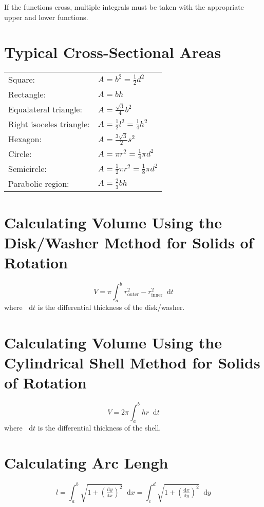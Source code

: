 \documentclass[12pt]{article}
\newcommand*{\fixmath}{\makebox{}\vspace{\glueexpr-\baselineskip-\abovedisplayskip}}
\newcommand*{\dd}[3][]{\tfrac{\mathrm{d}^{#1}#2}{\mathrm{d}#3^{#1}}}
\newcommand*{\D}[1]{\mathop{}\!\mathrm{d} #1}
\newenvironment{rmaskip}{\setlength{\abovedisplayskip}{0pt}\fixmath%
  \ignorespaces}{\ignorespacesafterend}
\newenvironment{rmbskip}{\setlength{\belowdisplayskip}{0pt}\ignorespaces}%
  {\ignorespacesafterend}
\begin{document}
If the functions cross, multiple integrals must be taken with the appropriate
upper and lower functions.
\section*{Typical Cross-Sectional Areas}
{\renewcommand{\arraystretch}{1.5}\begin{tabular}{l@{ }l}
  Square: & \(A = b^2 = \frac{1}{2}d^2\)\\
  Rectangle: & \(A = bh\)\\
  Equalateral triangle: & \(A = \frac{\sqrt{3}}{4}b^2\)\\
  Right isoceles triangle: & \(A = \frac{1}{2}l^2 = \frac{1}{4}h^2\)\\
  Hexagon: & \(A = \frac{3\sqrt{3}}{2} s^2\)\\
  Circle: & \(A = \pi r^2 = \frac{1}{4}\pi d^2\)\\
  Semicircle: & \(A = \frac{1}{2}\pi r^2 = \frac{1}{8}\pi d^2\)\\
  Parabolic region: & \(A = \frac{2}{3}bh\)
\end{tabular}}
\section*{Calculating Volume Using the Disk\slash Washer Method for Solids of
Rotation}
\begin{rmaskip}
  \[
    V = \pi\int_a^b r_{\text{outer}}^2 - r_{\text{inner}}^2 \D{t}
  \]
\end{rmaskip}
where \(\D{t}\) is the differential thickness of the disk\slash washer.
\section*{Calculating Volume Using the Cylindrical Shell Method for Solids of
Rotation}
\begin{rmaskip}
  \[
    V = 2\pi \int_a^b hr \D{t}
  \]
\end{rmaskip}
where \(\D{t}\) is the differential thickness of the shell.
\section*{Calculating Arc Lengh}
\begin{rmbskip}
  \[
    l = \int_a^b \sqrt{1+{\left(\dd{y}{x}\right)}^2} \D{x}
    = \int_c^d \sqrt{1+{\left(\dd{x}{y}\right)}^2} \D{y}
  \]
\end{rmbskip}
\end{document}
